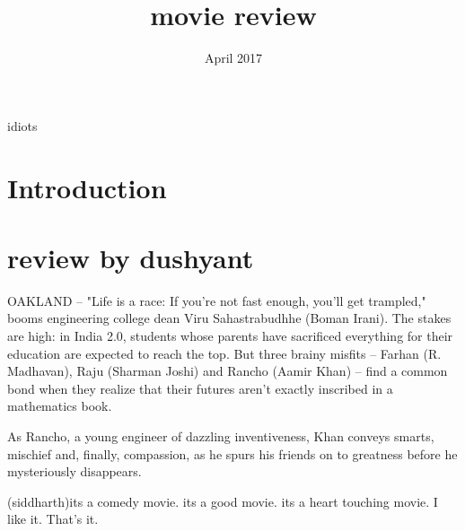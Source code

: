 \documentclass{article}
\title{movie review}
\date{April 2017}
\begin{document}
 idiots
\section{Introduction}

\section{review by dushyant}
OAKLAND -- "Life is a race: If you're not fast enough, you'll get trampled," booms engineering college dean Viru Sahastrabudhhe (Boman Irani). The stakes are high: in India 2.0, students whose parents have sacrificed everything for their education are expected to reach the top. But three brainy misfits -- Farhan (R. Madhavan), Raju (Sharman Joshi) and Rancho (Aamir Khan) -- find a common bond when they realize that their futures aren't exactly inscribed in a mathematics book.

As Rancho, a young engineer of dazzling inventiveness, Khan conveys smarts, mischief and, finally, compassion, as he spurs his friends on to greatness before he mysteriously disappears.


(siddharth)its a comedy movie. its a good movie. its a heart touching movie. I like it. That's it.  
\end{document}
